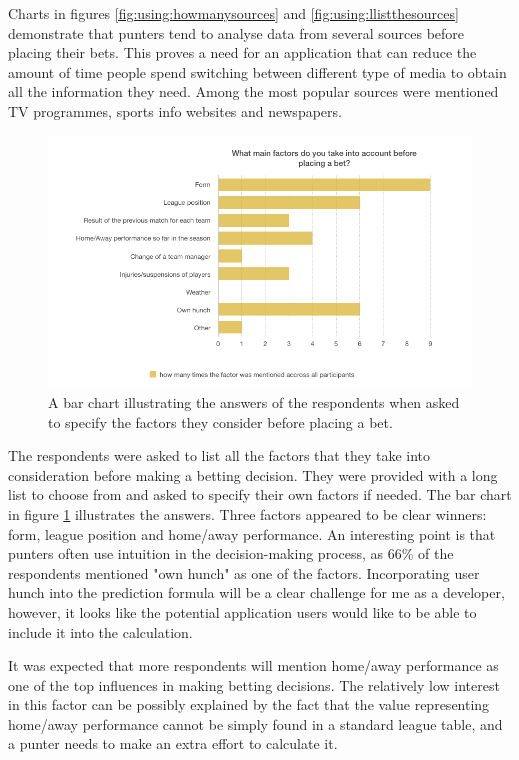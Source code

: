 Charts in figures \ref{fig:using:howmanysources} and \ref{fig:using:llistthesources} demonstrate that punters tend to analyse data from several sources before placing their bets. This proves a need for an application that can reduce the amount of time people spend switching between different type of media to obtain all the information they need. Among the most popular sources were mentioned TV programmes, sports info websites and newspapers.

\begin{figure}[H]
	\begin{center}
		\includegraphics[width=1.0\columnwidth]{req/images/listYourFactors.png}
		\caption{A bar chart illustrating the answers of the respondents when asked to specify the factors they consider before placing a bet.}
		\label{fig:using:listyourfactors}
	\end{center}
\end{figure}

The respondents were asked to list all the factors that they take into consideration before making a betting decision. They were provided with a long list to choose from and asked to specify their own factors if needed. The bar chart in figure \ref{fig:using:listyourfactors} illustrates the answers. Three factors appeared to be clear winners: form, league position and home/away performance. An interesting point is that punters often use intuition in the decision-making process, as 66\% of the respondents mentioned "own hunch" as one of the factors. Incorporating user hunch into the prediction formula will be a clear challenge for me as a developer, however, it looks like the potential application users would like to be able to include it into the calculation.

It was expected that more respondents will mention home/away performance as one of the top influences in making betting decisions. The relatively low interest in this factor can be possibly explained by the fact that the value representing home/away performance cannot be simply found in a standard league table, and a punter needs to make an extra effort to calculate it.


